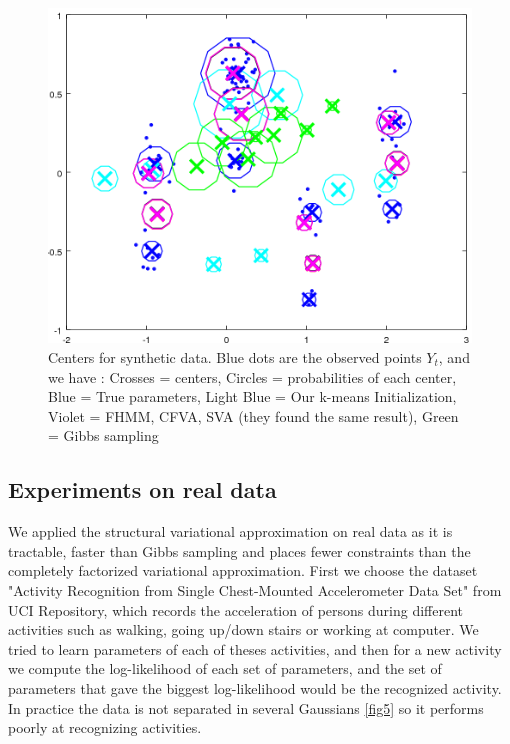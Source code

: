 \documentclass{article}
\begin{document}
\begin{figure}[h]
	\centering
	\includegraphics[width=1.0\textwidth]{fig11.png}
	\caption{Centers for synthetic data. Blue dots are the observed points $Y_t$, and we have : Crosses = centers, Circles = probabilities of each center, Blue = True parameters, Light Blue = Our k-means Initialization, Violet = FHMM, CFVA, SVA (they found the same result), Green = Gibbs sampling}
	\label{fig6}
\end{figure}

\subsection{Experiments on real data}

We applied the structural variational approximation on real data as it is tractable, faster than Gibbs sampling and places fewer constraints than the completely factorized variational approximation. First we choose the dataset "Activity Recognition from Single Chest-Mounted Accelerometer Data Set" from UCI Repository, which records the acceleration of persons during different activities such as walking, going up/down stairs or working at computer. We tried to learn parameters of each of theses activities, and then for a new activity we compute the log-likelihood of each set of parameters, and the set of parameters that gave the biggest log-likelihood would be the recognized activity. In practice the data is not separated in several Gaussians \ref{fig5} so it performs poorly at recognizing activities.
\end{document}
